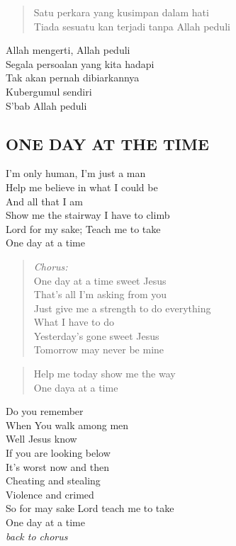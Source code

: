 \begin{verse}
Satu perkara yang kusimpan dalam hati\\
Tiada sesuatu kan terjadi tanpa Allah peduli
\end{verse}

\begin{altverse}
Allah mengerti, Allah peduli\\
Segala persoalan yang kita hadapi\\
Tak akan pernah dibiarkannya\\
Kubergumul sendiri\\
S’bab Allah peduli
\end{altverse}

\subsection{ ONE DAY AT THE TIME}
\begin{altverse}
I’m only human, I’m just a man\\
Help me believe in what I could be\\
And all that I am\\
Show me the stairway I have to climb\\
Lord for my sake; Teach me to take\\
One day at a time
\end{altverse}

\begin{verse}
\textit{Chorus:}\\
One day at a time sweet Jesus\\
That’s all I’m asking from you\\
Just give me a strength to do everything\\
What I have to do\\
Yesterday’s gone sweet Jesus\\
Tomorrow may never be mine
\end{verse}

\begin{verse}
Help me today show me the way\\
One daya at a time
\end{verse}

\begin{altverse}
Do you remember\\
When You walk among men\\
Well Jesus know\\
If you are looking below\\
It’s worst now and then\\
Cheating and stealing\\
Violence and crimed\\
So for may sake Lord teach me to take\\
One day at a time\\
\textit{back to chorus}
\end{altverse}

